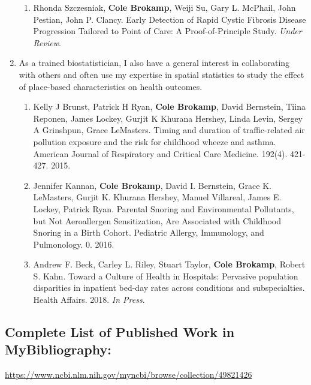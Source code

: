 \documentclass{nihbiosketch}
\begin{document}
\begin{enumerate}
\begin{enumerate}
	\item Rhonda Szczesniak, \textbf{Cole Brokamp}, Weiji Su, Gary L. McPhail, John Pestian, John P. Clancy. Early Detection of Rapid Cystic Fibrosis Disease Progression Tailored to Point of Care: A Proof-of-Principle Study. \emph{Under Review}.

\end{enumerate}

\item As a trained biostatistician, I also have a general interest in collaborating with others and often use my expertise in spatial statistics to study the effect of place-based characteristics on health outcomes.

\begin{enumerate}

	\item Kelly J Brunst, Patrick H Ryan, \textbf{Cole Brokamp}, David Bernstein, Tiina Reponen, James Lockey, Gurjit K Khurana Hershey, Linda Levin, Sergey A Grinshpun, Grace LeMasters. Timing and duration of traffic-related air pollution exposure and the risk for childhood wheeze and asthma. American Journal of Respiratory and Critical Care Medicine. 192(4). 421-427. 2015.

	\item Jennifer Kannan, \textbf{Cole Brokamp}, David I. Bernstein, Grace K. LeMasters, Gurjit K. Khurana Hershey, Manuel Villareal, James E. Lockey, Patrick Ryan. Parental Snoring and Environmental Pollutants, but Not Aeroallergen Sensitization, Are Associated with Childhood Snoring in a Birth Cohort. Pediatric Allergy, Immunology, and Pulmonology. 0. 2016.
	
	\item Andrew F. Beck, Carley L. Riley, Stuart Taylor, \textbf{Cole Brokamp}, Robert S. Kahn. Toward a Culture of Health in Hospitals: Pervasive population disparities in inpatient bed-day rates across conditions and subspecialties. Health Affairs. 2018. \emph{In Press}.

\end{enumerate}

\end{enumerate}

\subsection*{Complete List of Published Work in MyBibliography:} 
\url{https://www.ncbi.nlm.nih.gov/myncbi/browse/collection/49821426}


\end{document}
